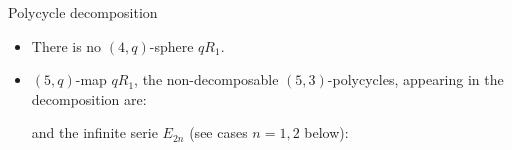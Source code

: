 \documentclass[%
pdf,
colorBG,
slideColor,
]{prosper}
\begin{document}
\begin{slide}{Polycycle decomposition}
\vspace{-3mm}
\begin{itemize}
\item There is no $(4,q)$-sphere $qR_1$.
\item $(5,q)$-map $qR_1$, the non-decomposable $(5,3)$-polycycles, appearing in the decomposition are:
\begin{center}
\begin{minipage}{3.4cm}
\centering
{}\par
\end{minipage}
\begin{minipage}{3.4cm}
\centering
{}\par
\end{minipage}
\begin{minipage}{3.4cm}
\centering
{}\par
\end{minipage}
\begin{minipage}{3.4cm}
\centering
{}\par
\end{minipage}
\begin{minipage}{3.4cm}
\centering
{}\par
\end{minipage}
\end{center}
and the infinite serie $E_{2n}$ (see cases $n=1,2$ below):
\begin{center}
\begin{minipage}{4.7cm}
\centering
{}\par
\end{minipage}
\begin{minipage}{4.7cm}
\centering
{}\par
\end{minipage}
\end{center}

\end{itemize}
\end{slide}
\end{document}
